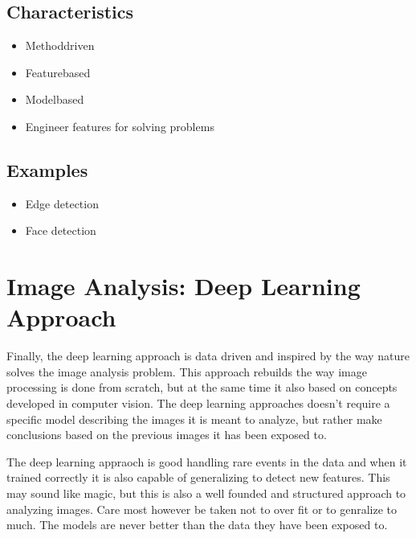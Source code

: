 \documentclass[letterpaper,10pt,english]{sphinxmanual}
\begin{document}
\subsection{Characteristics}
\label{\detokenize{01-Introduction:id1}}\begin{itemize}
\item {} 
\sphinxAtStartPar
Method\sphinxhyphen{}driven

\item {} 
\sphinxAtStartPar
Feature\sphinxhyphen{}based

\item {} 
\sphinxAtStartPar
{} Model\sphinxhyphen{}based

\item {} 
\sphinxAtStartPar
Engineer features for solving problems

\end{itemize}


\subsection{Examples}
\label{\detokenize{01-Introduction:id2}}\begin{itemize}
\item {} 
\sphinxAtStartPar
Edge detection

\item {} 
\sphinxAtStartPar
Face detection

\end{itemize}




\section{Image Analysis: Deep Learning Approach}
\label{\detokenize{01-Introduction:image-analysis-deep-learning-approach}}
\sphinxAtStartPar
Finally, the deep learning approach is data driven and inspired by the way nature solves the image analysis problem. This approach rebuilds the way image processing is done from scratch, but at the same time it also based on concepts developed in computer vision. The deep learning approaches doesn’t require a specific model describing the images it is meant to analyze, but rather make conclusions based on the previous images it has been exposed to.

\sphinxAtStartPar
The deep learning appraoch is good handling rare events in the data and when it trained correctly it is also capable of generalizing to detect new features. This may sound like magic, but this is also a well founded and structured approach to analyzing images. Care most however be taken not to over fit or to genralize to much. The models are never better than the data they have been exposed to.
\end{document}
